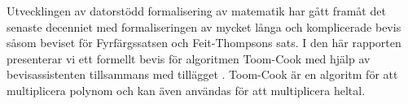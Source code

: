 Utvecklingen av datorstödd formalisering av matematik har gått framåt det
senaste decenniet med formaliseringen av mycket långa och komplicerade bevis
såsom beviset för Fyrfärgssatsen och Feit-Thompsons sats. I den här rapporten
presenterar vi ett formellt bevis för algoritmen Toom-Cook med hjälp av
bevisassistenten \coq{} tillsammans med tillägget \ssr{}. Toom-Cook är en algoritm
för att multiplicera polynom och kan även användas för att multiplicera heltal.

